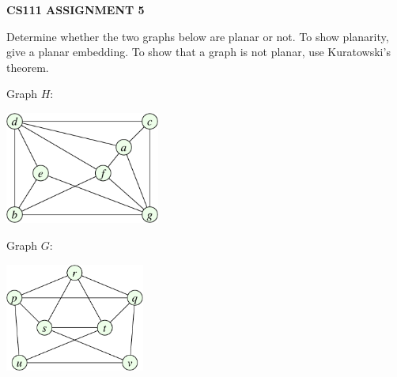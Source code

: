 \documentclass{article}
\begin{document}
\centerline{\large \bf CS111 ASSIGNMENT 5}

\vskip 0.25in


\begin{problem}
Determine whether the two graphs below are planar or not.
To show planarity, give a planar embedding.
To show that a graph is not planar, use Kuratowski's theorem.

\bigskip

\begin{center}
{\large Graph $H$:\ }
\begin{minipage}{2.1in}
        \includegraphics[width=2in]{planar_graphH_hw5.pdf}
\end{minipage}
\hfill
{\large Graph $G$:\ }
\begin{minipage}{2.4in}
        \includegraphics[width=1.8in]{planar_graphG_hw5.pdf}
\end{minipage}
\end{center}
\end{problem}

\end{document}
